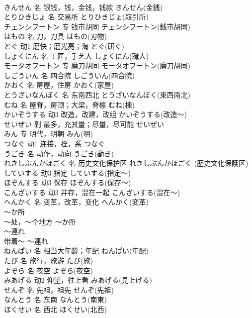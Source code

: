 \documentclass[8pt]{extreport}
\begin{document}
\begin{CJK}{UTF8}{min}
\\	きんせん	名	银钱，钱，金钱，钱款	きんせん(金銭)	
\\	とりひきじょ	名	交易所	とりひきじょ(取引所)	
\\	チェンシフートン	专	钱市胡同	チェンシフートン(銭市胡同)	
\\	はもの	名	刀，刀具	はもの(刃物)	
\\	とぐ	动1	磨快；磨光亮；淘	とぐ(研ぐ)	
\\	しょくにん	名	工匠，手艺人	しょくにん(職人)	
\\	モータオフートン	专	磨刀胡同	モータオフートン(磨刀胡同)	
\\	しごういん	名	四合院	しごういん(四合院)	
\\	かおく	名	房屋，住房	かおく(家屋)	
\\	とうざいなんぼく	名	东南西北	とうざいなんぼく(東西南北)	
\\	むね	名	屋脊，房顶；大梁，脊檩	むね(棟)	
\\	かいぞうする	动3	改造，改建，改组	かいぞうする(改造～)	
\\	せいぜい	副	最多，充其量；尽量，尽可能	せいぜい	
\\	みん	专	明代，明朝	みん(明)	
\\	つなぐ	动1	连接，拴，系	つなぐ	
\\	うごき	名	动作，动向	うごき(動き)	
\\	れきしぶんかほごく	名	历史文化保护区	れきしぶんかほごく (歴史文化保護区)	
\\	していする	动3	指定	していする(指定～)	
\\	ほぞんする	动3	保存	ほぞんする(保存～)	
\\	こんざいする	动3	并存，混在一起	こんざいする(混在～)	
\\	へんかく	名	变革，改革，变化	へんかく(変革)	
\\	～か所	
\\	～处，～个地方	～か所	
\\	～連れ	
\\	带着～	～連れ	
\\	ねんぱい	名	相当大年龄；年纪	ねんぱい(年配)	
\\	たび	名	旅行，旅游	たび(旅)	
\\	よぞら	名	夜空	よぞら(夜空)	
\\	みあげる	动2	仰望，往上看	みあげる(見上げる)	
\\	せんぞ	名	先祖，祖先	せんぞ(先祖)	
\\	なんとう	名	东南	なんとう(南東)	
\\	ほくせい	名	西北	ほくせい(北西)	

\end{CJK}
\end{document}
